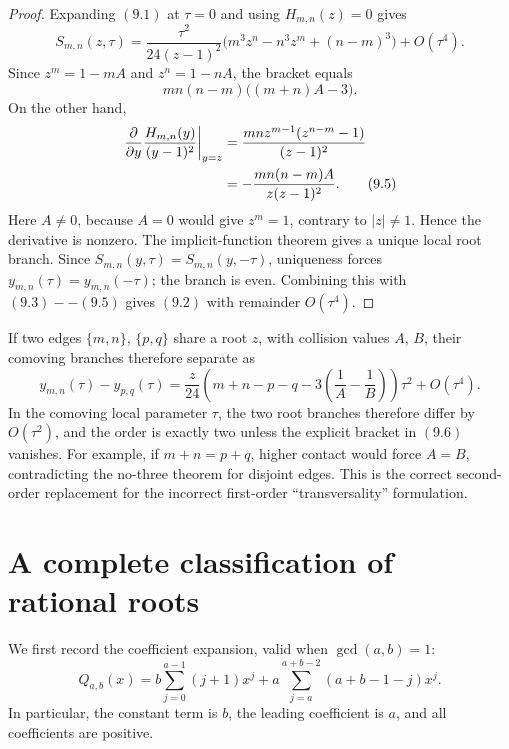\documentclass[11pt]{article}
\theoremstyle{definition}
\begin{document}
\begin{proof}
Expanding \((9.1)\) at \(\tau=0\) and using \(H_{m,n}(z)=0\) gives
\begin{equation}
 S_{m,n}(z,\tau)
 =\frac{\tau^2}{24(z-1)^2}
 \bigl(m^3z^n-n^3z^m+(n-m)^3\bigr)
 +O(\tau^4).
 \tag{9.3}
\end{equation}
Since \(z^m=1-mA\) and \(z^n=1-nA\), the bracket equals
\begin{equation}
 mn(n-m)\bigl((m+n)A-3\bigr).
 \tag{9.4}
\end{equation}
On the other hand,
\begin{align}
 \left.\frac{\partial}{\partial y}
 \frac{H_{m,n}(y)}{(y-1)^2}\right|_{y=z}
 &=\frac{mnz^{m-1}(z^{n-m}-1)}{(z-1)^2} \notag\\
 &=-\frac{mn(n-m)A}{z(z-1)^2}.
 \tag{9.5}
\end{align}
Here \(A\neq0\), because \(A=0\) would give \(z^m=1\), contrary to
\(|z|\neq1\).  Hence the derivative is nonzero.  The implicit-function
theorem gives a unique local root branch.  Since
\(S_{m,n}(y,\tau)=S_{m,n}(y,-\tau)\), uniqueness forces
\(y_{m,n}(\tau)=y_{m,n}(-\tau)\); the branch is even.  Combining this with
\((9.3)--(9.5)\) gives \((9.2)\) with remainder \(O(\tau^4)\).
\end{proof}

If two edges \(\{m,n\}\), \(\{p,q\}\) share a root \(z\), with collision
values \(A\), \(B\), their comoving branches therefore separate as
\begin{equation}
 y_{m,n}(\tau)-y_{p,q}(\tau)
 =\frac z{24}
 \left(m+n-p-q-3\left(\frac1A-\frac1B\right)\right)\tau^2
 +O(\tau^4).
 \tag{9.6}
\end{equation}
In the comoving local parameter \(\tau\), the two root branches therefore
differ by \(O(\tau^2)\), and the order is exactly two unless the explicit
bracket in \((9.6)\) vanishes.
For example, if \(m+n=p+q\), higher contact would force \(A=B\), contradicting
the no-three theorem for disjoint edges.  This is the correct second-order
replacement for the incorrect first-order ``transversality'' formulation.

\section{A complete classification of rational roots}
\label{sec:rational}

We first record the coefficient expansion, valid when \(\gcd(a,b)=1\):
\begin{equation}
 Q_{a,b}(x)=
 b\sum_{j=0}^{a-1}(j+1)x^j
 +a\sum_{j=a}^{a+b-2}(a+b-1-j)x^j.
 \tag{10.1}
\end{equation}
In particular, the constant term is \(b\), the leading coefficient is \(a\),
and all coefficients are positive.
\end{document}

